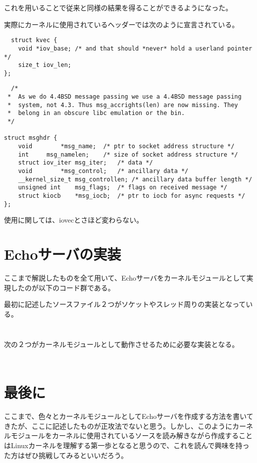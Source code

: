これを用いることで従来と同様の結果を得ることができるようになった。

実際にカーネルに使用されているヘッダーでは次のように宣言されている。
\begin{verbatim}
  struct kvec {
	void *iov_base; /* and that should *never* hold a userland pointer */
	size_t iov_len;
};
\end{verbatim}
\begin{verbatim}
  /*
 *	As we do 4.4BSD message passing we use a 4.4BSD message passing
 *	system, not 4.3. Thus msg_accrights(len) are now missing. They
 *	belong in an obscure libc emulation or the bin.
 */
 
struct msghdr {
	void		*msg_name;	/* ptr to socket address structure */
	int		msg_namelen;	/* size of socket address structure */
	struct iov_iter	msg_iter;	/* data */
	void		*msg_control;	/* ancillary data */
	__kernel_size_t	msg_controllen;	/* ancillary data buffer length */
	unsigned int	msg_flags;	/* flags on received message */
	struct kiocb	*msg_iocb;	/* ptr to iocb for async requests */
};
\end{verbatim}

使用に関しては、iovecとさほど変わらない。

\section{Echoサーバの実装}
ここまで解説したものを全て用いて、Echoサーバをカーネルモジュールとして実現したのが以下のコード群である。

最初に記述したソースファイル２つがソケットやスレッド周りの実装となっている。
\inputminted[frame=lines,framesep=2mm,baselinestretch=1.2,fontsize=\footnotesize,linenos,breaklines]{c}{\lrfasset/echo_server.c}
\inputminted[frame=lines,framesep=2mm,baselinestretch=1.2,fontsize=\footnotesize,linenos,breaklines]{c}{\lrfasset/echo_server.h}
次の２つがカーネルモジュールとして動作させるために必要な実装となる。
\inputminted[frame=lines,framesep=2mm,baselinestretch=1.2,fontsize=\footnotesize,linenos,breaklines]{c}{\lrfasset/fastecho.h}
\inputminted[frame=lines,framesep=2mm,baselinestretch=1.2,fontsize=\footnotesize,linenos,breaklines]{c}{\lrfasset/fastecho_module.c}

\section{最後に}
ここまで、色々とカーネルモジュールとしてEchoサーバを作成する方法を書いてきたが、ここに記述したものが正攻法でないと思う。しかし、このようにカーネルモジュールをカーネルに使用されているソースを読み解きながら作成することはLinuxカーネルを理解する第一歩となると思うので、これを読んで興味を持った方はぜひ挑戦してみるといいだろう。


